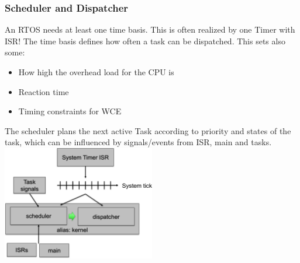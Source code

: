 \subsubsection{Scheduler and Dispatcher}
An RTOS needs at least one time basis.
This is often realized by one Timer with ISR!
The time basis defines how often a task can be dispatched.
This sets also some:
\begin{itemize}
    \item How high the overhead load for the CPU is
    \item Reaction time
    \item Timing constraints for WCE
\end{itemize}
The scheduler plans the next active Task according to priority and states of the task, which can be influenced by signals/events from ISR, main and tasks.\\
\includegraphics[width=0.5\textwidth]{images/RTOS/scheduler_dispatcher.png}


